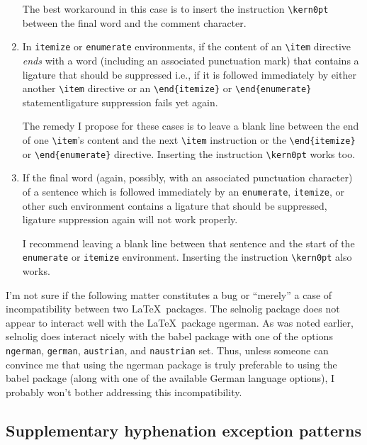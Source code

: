 \documentclass[11pt]{article}
\newcommand{\pkg}[1]{\textsf{#1}}
\newcommand{\opt}[1]{\texttt{#1}}
\newcommand{\cmmd}[1]{\texttt{\textbackslash #1}}
\begin{document}
\begin{enumerate}
The best workaround in this case is to insert the instruction \cmmd{kern0pt} between the final word and the comment character.

\item In \opt{itemize} or \opt{enumerate} environments, if the content of an \cmmd{item} directive \emph{ends} with a word (including an associated punctuation mark) that contains a ligature that should be suppressed \textemdash i.e., if it is followed immediately by either another \cmmd{item} directive or an \Verb+\end{itemize}+ or \Verb+\end{enumerate}+ statement\textemdash ligature  suppression fails yet again. 

The remedy I propose for these cases is to leave a blank line between the end of one \cmmd{item}'s content and the next \cmmd{item} instruction or the \Verb+\end{itemize}+ or \Verb+\end{enumerate}+ directive. Inserting the instruction \cmmd{kern0pt} works too.

\item If the final word (again, possibly, with an associated punctuation character) of a sentence which is followed immediately by an \opt{enumerate}, \opt{itemize}, or other such environment contains a ligature that should be suppressed, ligature suppression again will not work properly. 

I recommend leaving a blank line between that sentence and the start of the \opt{enumerate} or \opt{itemize} environment. Inserting the instruction \cmmd{kern0pt} also works.

\end{enumerate}

I'm not sure if the following matter constitutes a bug or \enquote{merely} a case of incompatibility between two \LaTeX\ packages. The \pkg{selnolig} package does not appear to interact well with the \LaTeX\ package \pkg{ngerman}. As was noted earlier, \pkg{selnolig} does interact nicely with the \pkg{babel} package with one of the options \opt{ngerman}, \opt{german}, \opt{austrian}, and \opt{naustrian} set. Thus, unless someone can convince me that using the \pkg{ngerman} package is truly preferable to using the \pkg{babel} package (along with one of the available German language options), I probably won't bother addressing this incompatibility.



\subsection{Supplementary hyphenation exception patterns} \label{sec:addlhyph}
\end{document}
